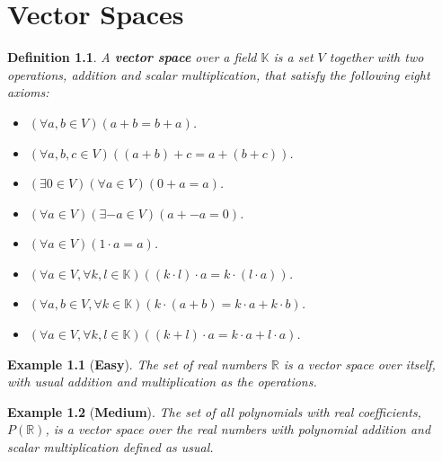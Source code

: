 \usepackage{amsmath, amsthm, amsfonts}

\newtheorem{definition}{Definition}[chapter]
\newtheorem{example}{Example}[chapter]
\newtheorem{proposition}{Proposition}[chapter]


	
	\chapter{Vector Spaces}
	
	\begin{definition}
		A \textbf{vector space} over a field $\mathbb{K}$ is a set $V$ together with two operations, addition and scalar multiplication, that satisfy the following eight axioms:
		
		\begin{itemize}
			\item[(V1)] $(\forall a,b \in V) (a + b = b + a)$.
			\item[(V2)] $(\forall a,b,c \in V) ((a + b) + c = a + (b + c))$.
			\item[(V3)] $(\exists 0 \in V) (\forall a \in V) (0 + a = a)$.
			\item[(V4)] $(\forall a \in V) (\exists -a \in V) (a + -a = 0)$.
			\item[(V5)] $(\forall a \in V) (1 \cdot a = a)$.
			\item[(V6)] $(\forall a \in V, \forall k,l \in \mathbb{K}) ((k \cdot l) \cdot a = k \cdot (l \cdot a))$.
			\item[(V7)] $(\forall a,b \in V, \forall k \in \mathbb{K}) (k \cdot (a + b) = k \cdot a + k \cdot b)$.
			\item[(V8)] $(\forall a \in V, \forall k,l \in \mathbb{K}) ((k + l) \cdot a = k \cdot a + l \cdot a)$.
		\end{itemize}
	\end{definition}
	
	\begin{example}[\textbf{Easy}]
		The set of real numbers $\mathbb{R}$ is a vector space over itself, with usual addition and multiplication as the operations.
	\end{example}
	
	\begin{example}[\textbf{Medium}]
		The set of all polynomials with real coefficients, $P(\mathbb{R})$, is a vector space over the real numbers with polynomial addition and scalar multiplication defined as usual.
	\end{example}
	
